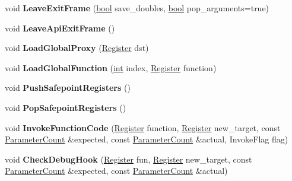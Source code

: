 \begin{DoxyCompactItemize}
void {\bfseries Leave\+Exit\+Frame} (\mbox{\hyperlink{classbool}{bool}} save\+\_\+doubles, \mbox{\hyperlink{classbool}{bool}} pop\+\_\+arguments=true)
\item 
\mbox{\label{classv8_1_1internal_1_1MacroAssembler_aefbc121a575d14280652182962e4f94b}} 
void {\bfseries Leave\+Api\+Exit\+Frame} ()
\item 
\mbox{\label{classv8_1_1internal_1_1MacroAssembler_a8139c3ce1dd60f65909755011ef7f9d1}} 
void {\bfseries Load\+Global\+Proxy} (\mbox{\hyperlink{classv8_1_1internal_1_1Register}{Register}} dst)
\item 
\mbox{\label{classv8_1_1internal_1_1MacroAssembler_ac8fdaea8fc2d2b40547252e86cbaeefa}} 
void {\bfseries Load\+Global\+Function} (\mbox{\hyperlink{classint}{int}} index, \mbox{\hyperlink{classv8_1_1internal_1_1Register}{Register}} function)
\item 
\mbox{\label{classv8_1_1internal_1_1MacroAssembler_aca545d9193d7a468e285a5ba66fb6f19}} 
void {\bfseries Push\+Safepoint\+Registers} ()
\item 
\mbox{\label{classv8_1_1internal_1_1MacroAssembler_accf004371b050ef53eb57724f4d8d8b1}} 
void {\bfseries Pop\+Safepoint\+Registers} ()
\item 
\mbox{\label{classv8_1_1internal_1_1MacroAssembler_a45a3612fb3be7000eb94309ac385674b}} 
void {\bfseries Invoke\+Function\+Code} (\mbox{\hyperlink{classv8_1_1internal_1_1Register}{Register}} function, \mbox{\hyperlink{classv8_1_1internal_1_1Register}{Register}} new\+\_\+target, const \mbox{\hyperlink{classv8_1_1internal_1_1ParameterCount}{Parameter\+Count}} \&expected, const \mbox{\hyperlink{classv8_1_1internal_1_1ParameterCount}{Parameter\+Count}} \&actual, Invoke\+Flag flag)
\item 
\mbox{\label{classv8_1_1internal_1_1MacroAssembler_a2cf2b9ab50d1b6efcd90587f2502451b}} 
void {\bfseries Check\+Debug\+Hook} (\mbox{\hyperlink{classv8_1_1internal_1_1Register}{Register}} fun, \mbox{\hyperlink{classv8_1_1internal_1_1Register}{Register}} new\+\_\+target, const \mbox{\hyperlink{classv8_1_1internal_1_1ParameterCount}{Parameter\+Count}} \&expected, const \mbox{\hyperlink{classv8_1_1internal_1_1ParameterCount}{Parameter\+Count}} \&actual)

\end{DoxyCompactItemize}
